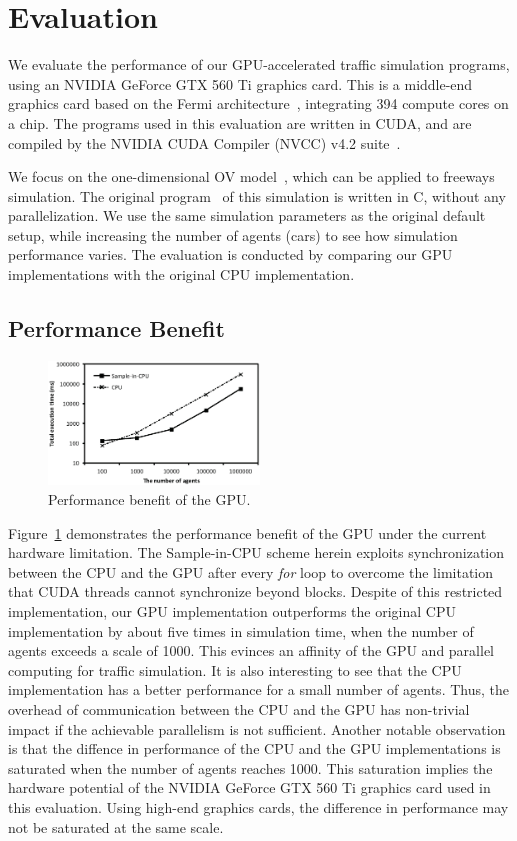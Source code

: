 \documentclass[times, 10pt, twocolumn]{article}
\begin{document}
\section{Evaluation}
\label{sec:evaluation}

We evaluate the performance of our GPU-accelerated traffic simulation
programs, using an NVIDIA GeForce GTX 560 Ti graphics card.
This is a middle-end graphics card based on the Fermi
architecture~\cite{NVIDIA_Fermi}, integrating 394 compute cores on a chip.
The programs used in this evaluation are written in CUDA, and are
compiled by the NVIDIA CUDA Compiler (NVCC) v4.2 suite~\cite{CUDA42}.

We focus on the one-dimensional OV model~\cite{Bando1995}, which can be
applied to freeways simulation.
The original program~\cite{OV_Program} of this simulation is written in
C, without any parallelization.
We use the same simulation parameters as the original default setup,
while increasing the number of agents (cars) to see how simulation
performance varies. 
The evaluation is conducted by comparing our GPU implementations with
the original CPU implementation.

\subsection{Performance Benefit}

\begin{figure}[t]
\centering
\includegraphics[width=0.5\textwidth]{eps/eval_accel.eps}
\caption{Performance benefit of the GPU.}
\label{fig:eval_benefit}
\end{figure}

Figure~\ref{fig:eval_benefit} demonstrates the performance benefit of
the GPU under the current hardware limitation.
The Sample-in-CPU scheme herein exploits synchronization between the CPU
and the GPU after every \textit{for} loop to overcome the limitation that
CUDA threads cannot synchronize beyond blocks.
Despite of this restricted implementation, our GPU implementation
outperforms the original CPU implementation by about five times in
simulation time, when the number of agents exceeds a scale of 1000.
This evinces an affinity of the GPU and parallel computing for traffic
simulation.
It is also interesting to see that the CPU implementation has a better
performance for a small number of agents.
Thus, the overhead of communication between the CPU and the GPU has
non-trivial impact if the achievable parallelism is not sufficient.
Another notable observation is that the diffence in performance of the
CPU and the GPU implementations is saturated when the number of agents
reaches 1000.
This saturation implies the hardware potential of the NVIDIA GeForce GTX
560 Ti graphics card used in this evaluation.
Using high-end graphics cards, the difference in performance may not be
saturated at the same scale.
\end{document}
